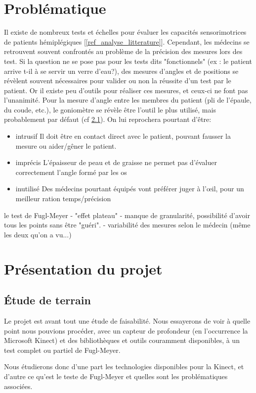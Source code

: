 \documentclass[french,12pt]{report}
\begin{document}
		\section{Problématique}
Il existe de nombreux tests et échelles pour évaluer les capacités sensorimotrices de patients hémiplégiques [\ref {ref_analyse_litterature}]. Cependant, les médecins se retrouvent souvent confrontés au problème de la précision des mesures lors des test. Si la question ne se pose pas pour les tests dits "fonctionnels" (ex : le patient arrive t-il à se servir un verre d'eau?), des mesures d'angles et de positions se révèlent souvent nécessaires pour valider ou non la réussite d'un test par le patient. Or il existe peu d'outils pour réaliser ces mesures, et ceux-ci ne font pas l'unanimité. Pour la mesure d'angle entre les membres du patient (pli de l'épaule, du coude, etc.), le goniomètre se révèle être l'outil le plus utilisé, mais probablement par défaut (cf \ref{}). On lui reprochera pourtant d'être: 
\begin{itemize}
	\item {intrusif} Il doit être en contact direct avec le patient, pouvant fausser la mesure ou aider/gêner le patient.
	\item {imprécis} L'épaisseur de peau et de graisse ne permet pas d'évaluer correctement l'angle formé par les os
	\item {inutilisé} Des médecins pourtant équipés vont préférer juger à l'œil, pour un meilleur ration temps/précision
\end{itemize}
		
		le test de Fugl-Meyer
		- "effet plateau" - manque de granularité, possibilité d'avoir tous les points sans être "guéri".
		- variabilité des mesures selon le médecin (même les deux qu'on a vu...)		
\newpage
		\section{Présentation du projet}
		
			\subsection{Étude de terrain}
		Le projet est avant tout une étude de faisabilité. Nous essayerons de voir
		à quelle point nous pouvions procéder, avec un capteur de profondeur (en
		l'occurrence la Microsoft Kinect) et des bibliothèques et outils couramment 
		disponibles, à un test complet ou partiel de Fugl-Meyer.
		
		Nous étudierons donc d'une part les technologies disponibles pour la Kinect,
		et d'autre ce qu'est le teste de Fugl-Meyer et quelles sont les 
		problématiques associées.
		
\end{document}
